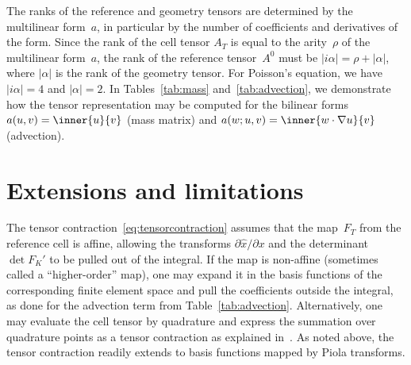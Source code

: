 The ranks of the reference and geometry tensors are determined by the
multilinear form~$a$, in particular by the number of coefficients and
derivatives of the form. Since the rank of the cell tensor $A_T$ is
equal to the arity~$\rho$ of the multilinear form~$a$, the rank of the
reference tensor~$A^0$ must be $|i\alpha| = \rho + |\alpha|$, where
$|\alpha|$ is the rank of the geometry tensor. For Poisson's equation,
we have $|i\alpha| = 4$ and $|\alpha| = 2$. In Tables~\ref{tab:mass}
and~\ref{tab:advection}, we demonstrate how the tensor representation
may be computed for the bilinear forms $a(u, v) = \inner{u}{v}$ (mass
matrix) and $a(w; u, v) = \inner{w \cdot \nabla u}{v}$ (advection).


\section{Extensions and limitations}

The tensor contraction~\eqref{eq:tensorcontraction} assumes that the
map~$F_T$ from the reference cell is affine, allowing the transforms
$\partial \hat{x} / \partial x$ and the determinant $\det F_K'$ to be pulled
out of the integral. If the map is non-affine (sometimes called a
``higher-order'' map), one may expand it in the basis functions of the
corresponding finite element space and pull the coefficients outside
the integral, as done for the advection term from
Table~\ref{tab:advection}. Alternatively, one may evaluate the cell
tensor by quadrature and express the summation over quadrature points
as a tensor contraction as explained in~\citet{KirbyLogg2006}.  As
noted above, the tensor contraction readily extends to basis functions
mapped by Piola transforms.

